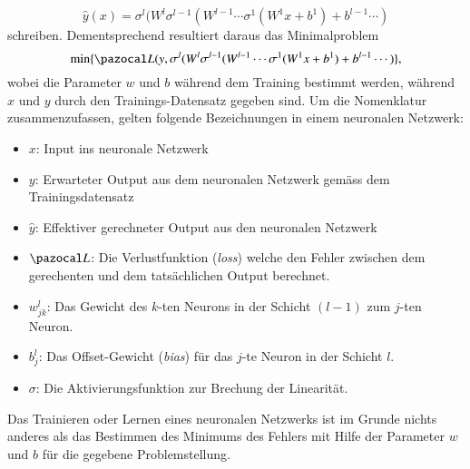 \begin{equation}
\hat{y}(x) = \sigma^{l}(W^{l}\sigma^{l-1}(W^{l-1}\cdots \sigma^{1}(W^{1}x+b^{1}) + b^{l-1} \cdots )
\label{ableitung:eqn:full_net}
\end{equation}
schreiben. Dementsprechend resultiert daraus das Minimalproblem
\begin{equation}
	\min \{ \Lb(y, \sigma^{l}(W^{l}\sigma^{l-1}(W^{l-1}\cdots \sigma^{1}(W^{1}x+b^{1}) + b^{l-1} \cdots ) \} \text{,} %
\end{equation}
wobei die Parameter $w$ und $b$ während dem Training bestimmt werden, während $x$ und $y$ durch den Trainings-Datensatz gegeben sind.
Um die Nomenklatur zusammenzufassen, gelten folgende Bezeichnungen in einem neuronalen Netzwerk: 
\begin{itemize}
	\item{$x$: Input ins neuronale Netzwerk}
	\item{$y$: Erwarteter Output aus dem neuronalen Netzwerk gemäss dem Trainingsdatensatz}
	\item{$\hat{y}$: Effektiver gerechneter Output aus den neuronalen Netzwerk}
	\item{$\Lb$: Die Verlustfunktion ({\em loss}) welche den Fehler zwischen dem gerechenten und dem tatsächlichen Output berechnet.}
	\item{$w_{jk}^{l}$: Das Gewicht des $k$-ten Neurons in der Schicht $(l-1)$ zum $j$-ten Neuron.}
	\item{$b_{j}^{l}$: Das Offset-Gewicht ({\em bias}) für das $j$-te Neuron in der Schicht $l$.}
	\item{$\sigma$: Die Aktivierungsfunktion zur Brechung der Linearität.}
\end{itemize}
Das Trainieren oder Lernen eines neuronalen Netzwerks ist im Grunde
nichts anderes als das Bestimmen des Minimums des Fehlers mit Hilfe
der Parameter $w$ und $b$ für die gegebene Problemstellung.
%
%
